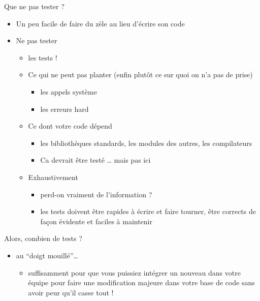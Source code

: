 \begin{frame}{Que ne pas tester ?}

\begin{itemize}
\itemsep1pt\parskip0pt
\item
  Un peu facile de faire du zèle au lieu d'écrire son code
\item
  Ne pas tester

  \begin{itemize}
  \itemsep1pt\parskip0pt
  \item
    les tests !
  \item
    Ce qui ne peut pas planter (enfin plutôt ce sur quoi on n'a pas de
    prise)

    \begin{itemize}
    \itemsep1pt\parskip0pt
    \item
      les appels système
    \item
      les erreurs hard
    \end{itemize}
  \item
    Ce dont votre code dépend

    \begin{itemize}
    \itemsep1pt\parskip0pt
    \item
      les bibliothèques standards, les modules des autres, les
      compilateurs
    \item
      Ca devrait être testé \ldots{} mais pas ici
    \end{itemize}
  \item
    Exhaustivement

    \begin{itemize}
    \itemsep1pt\parskip0pt
    \item
      perd-on vraiment de l'information ?
    \item
      les tests doivent être rapides à écrire et faire tourner, être
      corrects de façon évidente et faciles à maintenir
    \end{itemize}
  \end{itemize}
\end{itemize}

\end{frame}

\begin{frame}{Alors, combien de tests ?}

\begin{itemize}
\itemsep1pt\parskip0pt
\item
  au ``doigt mouillé''\ldots{}

  \begin{itemize}
  \itemsep1pt\parskip0pt
  \item
    suffisamment pour que vous puissiez intégrer un nouveau dans votre
    équipe pour faire une modification majeure dans votre base de code
    sans avoir peur qu'il casse tout !
  \end{itemize}
\end{itemize}

\end{frame}

